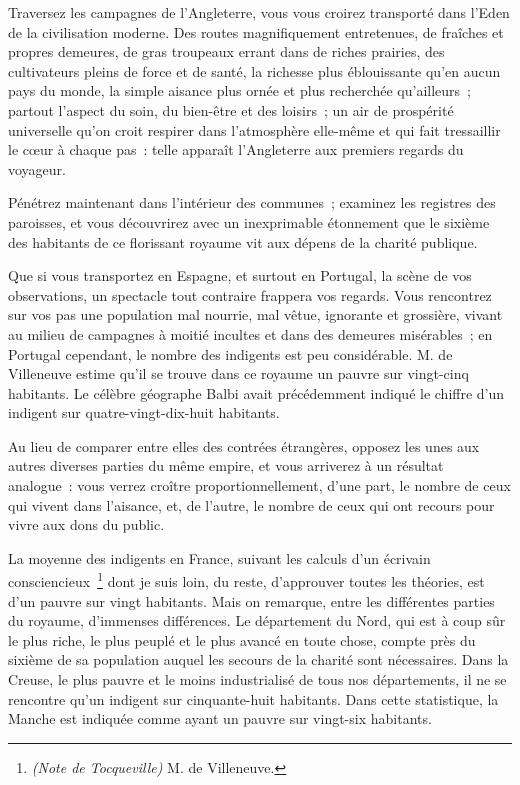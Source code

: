 \documentclass[twoside]{book} %
\begin{document}
\noindent Traversez les campagnes de l’Angleterre, vous vous croirez transporté dans l’Eden de la civilisation moderne. Des routes magnifiquement entretenues, de fraîches et propres demeures, de gras troupeaux errant dans de riches prairies, des cultivateurs pleins de force et de santé, la richesse plus éblouissante qu’en aucun pays du monde, la simple aisance plus ornée et plus recherchée qu’ailleurs ; partout l’aspect du soin, du bien-être et des loisirs ; un air de prospérité universelle qu’on croit respirer dans l’atmosphère elle-même et qui fait tressaillir le cœur à chaque pas : telle apparaît l’Angleterre aux premiers regards du voyageur.\par
Pénétrez maintenant dans l’intérieur des communes ; examinez les registres des paroisses, et vous découvrirez avec un inexprimable étonnement que le sixième des habitants de ce florissant royaume vit aux dépens de la charité publique.\par
Que si vous transportez en Espagne, et surtout en Portugal, la scène de vos observations, un spectacle tout contraire frappera vos regards. Vous rencontrez sur vos pas une population mal nourrie, mal vêtue, ignorante et grossière, vivant au milieu de campagnes à moitié incultes et dans des demeures misérables ; en Portugal cependant, le nombre des indigents est peu considérable. M. de Villeneuve estime qu’il se trouve dans ce royaume un pauvre sur vingt-cinq habitants. Le célèbre géographe Balbi avait précédemment indiqué le chiffre d’un indigent sur quatre-vingt-dix-huit habitants.\par
\bigbreak
\noindent Au lieu de comparer entre elles des contrées étrangères, opposez les unes aux autres diverses parties du même empire, et vous arriverez à un résultat analogue : vous verrez croître proportionnellement, d’une part, le nombre de ceux qui vivent dans l’aisance, et, de l’autre, le nombre de ceux qui ont recours pour vivre aux dons du public.\par
La moyenne des indigents en France, suivant les calculs d’un écrivain consciencieux \footnote{\emph{(Note de Tocqueville)} M. de Villeneuve.} dont je suis loin, du reste, d’approuver toutes les théories, est d’un pauvre sur vingt habitants. Mais on remarque, entre les différentes parties du royaume, d’immenses différences. Le département du Nord, qui est à coup sûr le plus riche, le plus peuplé et le plus avancé en toute chose, compte près du sixième de sa population auquel les secours de la charité sont nécessaires. Dans la Creuse, le plus pauvre et le moins industrialisé de tous nos départements, il ne se rencontre qu’un indigent sur cinquante-huit habitants. Dans cette statistique, la Manche est indiquée comme ayant un pauvre sur vingt-six habitants.\par
\end{document}
